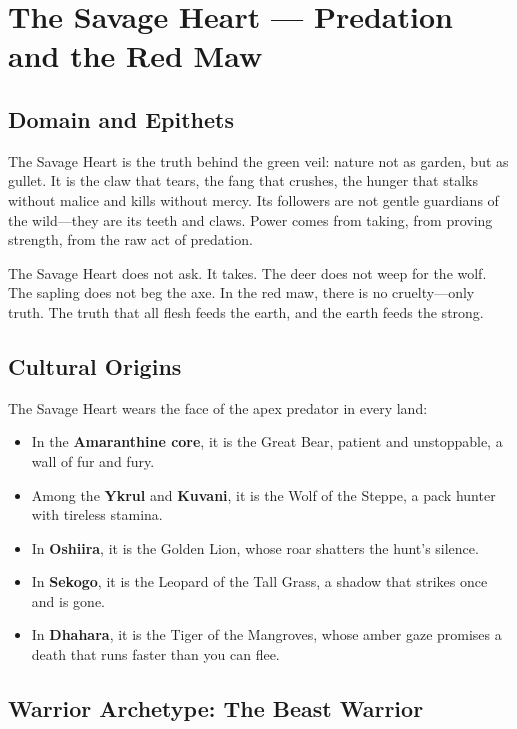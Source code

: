 \section{The Savage Heart — Predation and the Red Maw}

\subsection{Domain and Epithets}

The Savage Heart is the truth behind the green veil: nature not as garden, but as gullet. It is the claw that tears, the fang that crushes, the hunger that stalks without malice and kills without mercy. Its followers are not gentle guardians of the wild—they are its teeth and claws. Power comes from taking, from proving strength, from the raw act of predation.

The Savage Heart does not ask. It takes. The deer does not weep for the wolf. The sapling does not beg the axe. In the red maw, there is no cruelty—only truth. The truth that all flesh feeds the earth, and the earth feeds the strong.

\subsection{Cultural Origins}

The Savage Heart wears the face of the apex predator in every land:

\begin{itemize}
\item In the \textbf{Amaranthine core}, it is the Great Bear, patient and unstoppable, a wall of fur and fury.
\item Among the \textbf{Ykrul} and \textbf{Kuvani}, it is the Wolf of the Steppe, a pack hunter with tireless stamina.
\item In \textbf{Oshiira}, it is the Golden Lion, whose roar shatters the hunt's silence.
\item In \textbf{Sekogo}, it is the Leopard of the Tall Grass, a shadow that strikes once and is gone.
\item In \textbf{Dhahara}, it is the Tiger of the Mangroves, whose amber gaze promises a death that runs faster than you can flee.
\end{itemize}

\subsection{Warrior Archetype: The Beast Warrior}


